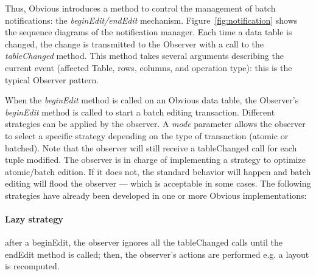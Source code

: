Thus, Obvious introduces a method to control the management of batch
notifications: the \emph{beginEdit/endEdit} mechanism.
Figure~\ref{fig:notification} shows the sequence diagrams of the
notification manager.  Each time a data table is changed, the change
is transmitted to the Observer with a call to the \emph{tableChanged}
method.  This method takes several arguments describing the current
event (affected Table, rows, columns, and operation type): this is the
typical Observer pattern.

When the \emph{beginEdit} method is called on an Obvious data table,
the Observer's \emph{beginEdit} method is called to start a batch
editing transaction.  Different strategies can be applied by the
observer.  A \emph{mode} parameter allows the observer to select a
specific strategy depending on the type of transaction (atomic or
batched).  Note that the observer will still receive a tableChanged
call for each tuple modified.  The observer is in charge of
implementing a strategy to optimize atomic/batch edition.  If it does
not, the standard behavior will happen and batch editing will flood
the observer --- which is acceptable in some cases.  The following
strategies have already been developed in one or more Obvious
implementations:

\paragraph{Lazy strategy} after a beginEdit, the observer ignores all the
  tableChanged calls until the endEdit method is called; then, the
  observer's actions are performed e.g. a layout is recomputed.

